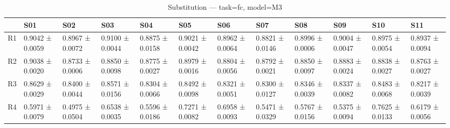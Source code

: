 \begin{table}[htbp]
\centering
\caption{Substitution — task=fc, model=M3}
\label{tab:sub:fc:M3}
\begin{tabular}{llllllllllll}
\toprule
\toprule
 & S01 & S02 & S03 & S04 & S05 & S06 & S07 & S08 & S09 & S10 & S11 \\
\midrule
\midrule
R1 & 0.9042 ± 0.0059 & 0.8967 ± 0.0072 & 0.9100 ± 0.0044 & 0.8875 ± 0.0158 & 0.9021 ± 0.0042 & 0.8962 ± 0.0064 & 0.8821 ± 0.0146 & 0.8996 ± 0.0006 & 0.9004 ± 0.0047 & 0.8975 ± 0.0054 & 0.8937 ± 0.0094 \\
R2 & 0.9038 ± 0.0020 & 0.8733 ± 0.0006 & 0.8850 ± 0.0098 & 0.8775 ± 0.0027 & 0.8979 ± 0.0016 & 0.8804 ± 0.0056 & 0.8792 ± 0.0021 & 0.8850 ± 0.0097 & 0.8883 ± 0.0024 & 0.8838 ± 0.0027 & 0.8763 ± 0.0027 \\
R3 & 0.8629 ± 0.0029 & 0.8400 ± 0.0044 & 0.8571 ± 0.0156 & 0.8304 ± 0.0066 & 0.8492 ± 0.0098 & 0.8321 ± 0.0051 & 0.8300 ± 0.0127 & 0.8346 ± 0.0039 & 0.8337 ± 0.0082 & 0.8483 ± 0.0068 & 0.8217 ± 0.0039 \\
R4 & 0.5971 ± 0.0079 & 0.4975 ± 0.0504 & 0.6538 ± 0.0035 & 0.5596 ± 0.0186 & 0.7271 ± 0.0082 & 0.6958 ± 0.0093 & 0.5471 ± 0.0329 & 0.5767 ± 0.0156 & 0.5375 ± 0.0094 & 0.7625 ± 0.0133 & 0.6179 ± 0.0056 \\
\bottomrule
\end{tabular}\end{table}
